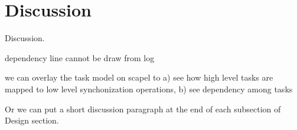 
\section{Discussion}
\label{sec:discussion}
Discussion. 

dependency line cannot be draw from log

we can overlay the task model on scapel to a) see how high
level tasks are mapped to low level synchonization
operations, b) see dependency among tasks

Or we can put a short discussion paragraph at the end of
each subsection of Design section.

